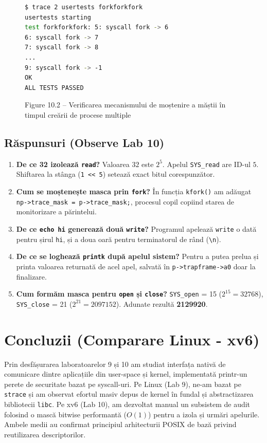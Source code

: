 \documentclass[12pt,a4paper]{article}
\begin{document}
\begin{figure}[h!]
\begin{lstlisting}[language=bash]
$ trace 2 usertests forkforkfork
usertests starting
test forkforkfork: 5: syscall fork -> 6
6: syscall fork -> 7
7: syscall fork -> 8
...
9: syscall fork -> -1
OK
ALL TESTS PASSED
\end{lstlisting}
\caption{Figure 10.2 -- Verificarea mecanismului de moștenire a măștii în timpul creării de procese multiple}
\end{figure}

\subsection{Răspunsuri (Observe Lab 10)}
\begin{enumerate}
    \item \textbf{De ce 32 izolează \texttt{read}?} Valoarea $32$ este $2^5$. Apelul \texttt{SYS\_read} are ID-ul $5$. Shiftarea la stânga (\texttt{1 << 5}) setează exact bitul corespunzător.
    \item \textbf{Cum se moștenește masca prin \texttt{fork}?} În funcția \texttt{kfork()} am adăugat \texttt{np->trace\_mask = p->trace\_mask;}, procesul copil copiind starea de monitorizare a părintelui.
    \item \textbf{De ce \texttt{echo hi} generează două \texttt{write}?} Programul apelează \texttt{write} o dată pentru șirul \texttt{hi}, și a doua oară pentru terminatorul de rând (\texttt{\textbackslash n}).
    \item \textbf{De ce se loghează \texttt{printk} după apelul sistem?} Pentru a putea prelua și printa valoarea returnată de acel apel, salvată în \texttt{p->trapframe->a0} doar la finalizare.
    \item \textbf{Cum formăm masca pentru \texttt{open} și \texttt{close}?} \texttt{SYS\_open} = 15 ($2^{15} = 32768$), \texttt{SYS\_close} = 21 ($2^{21} = 2097152$). Adunate rezultă \textbf{2129920}.
\end{enumerate}

\section{Concluzii (Comparare Linux - xv6)}
Prin desfășurarea laboratoarelor 9 și 10 am studiat interfața nativă de comunicare dintre aplicațiile din user-space și kernel, implementată printr-un perete de securitate bazat pe syscall-uri. Pe Linux (Lab 9), ne-am bazat pe \texttt{strace} și am observat efortul masiv depus de kernel în fundal și abstractizarea bibliotecii \texttt{libc}. Pe xv6 (Lab 10), am dezvoltat manual un subsistem de audit folosind o mască bitwise performantă ($O(1)$) pentru a izola și urmări apelurile. Ambele medii au confirmat principiul arhitecturii POSIX de bază privind reutilizarea descriptorilor.
\end{document}

